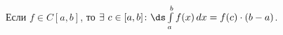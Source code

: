 
 		Если $f\in C[a,b]$, то $\exists\  c\in[a,b]\colon \ds\int\limits_a^bf(x)\,dx=f(c)\cdot(b-a)$.
 	